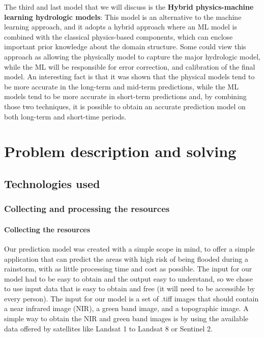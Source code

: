 \documentclass[12pt, a4paper]{report}
\begin{document}
The third and last model that we will discuss is the \textbf{Hybrid physics-machine learning hydrologic models}: This model is an alternative to the machine learning approach, and it adopts a hybrid approach where an ML model is combined with the classical physics-based components, which can enclose important prior knowledge about the domain structure. Some could view this approach as allowing the physically model to capture the major hydrologic  model, while the ML will be responsible for error correction, and calibration of the final model. An interesting fact is that it was shown that the physical models tend to be more accurate in the long-term and mid-term predictions, while the ML models tend to be more accurate in short-term predictions and, by combining those two techniques, it is possible to obtain an accurate prediction model on both long-term and short-time periods.



\newpage{}


\chapter{Problem description and solving}

\section{Technologies used}

\subsection{Collecting and processing the resources}

\subsubsection{Collecting the resources}

\quad
Our prediction model was created with a simple scope in mind, to offer a simple  application that can predict the areas with high risk of being flooded during a rainstorm, with as little processing time and cost as possible. The input for our model had to be easy to obtain and the output easy to understand, so we chose to use input data that is easy to obtain and free (it will need to be accessible by every person). The input for our model is a set of .tiff images that should contain a near infrared image (NIR), a green band image, and a topographic image. A simple way to obtain the NIR and green band images is by using the available data offered by satellites like Landsat 1 to Landsat 8 or Sentinel 2. 
\end{document}
